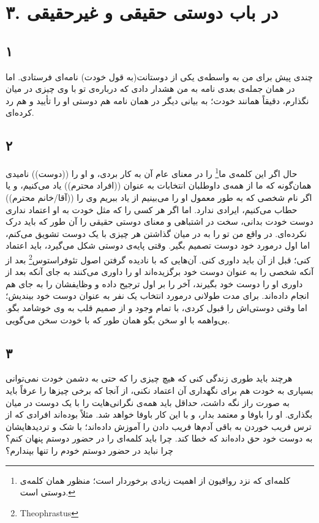 \documentclass{article}
\author{github.com/parasilius/moral-letters-to-lucilius}
\begin{document}
\section*{۳. در باب دوستی حقیقی و غیرحقیقی}
    \subsection*{۱}
    چندی پیش برای من به واسطه‌ی یکی از دوستانت(به قول خودت) نامه‌ای فرستادی.
    اما در همان جمله‌ی بعدی نامه به من هشدار دادی که درباره‌ی تو با وی چیزی در میان نگذارم، دقیقاً همانند خودت؛
    به بیانی دیگر در همان نامه هم دوستی او را تأیید و هم رد کرده‌ای.
    \subsection*{۲}
    حال اگر این کلمه‌ی ما\footnote{کلمه‌ای که نزد رواقیون از اهمیت زیادی برخوردار است؛ منظور همان کلمه‌ی دوستی است.} را در معنای عام آن به کار بردی، و او را ((دوست)) نامیدی همان‌گونه که ما از همه‌ی داوطلبان انتخابات به عنوان ((افراد محترم)) یاد می‌کنیم، و یا اگر نام شخصی که به طور معمول او را می‌بینیم از یاد ببریم وی را ((آقا/خانم محترم)) حطاب می‌‌کنیم، ایرادی ندارد.
    اما اگر هر کسی را که مثل خودت به او اعتماد نداری دوست خودت بدانی، سخت در اشتباهی و معنای دوستی حقیقی را آن طور که باید درک نکرده‌ای.
    در واقع من تو را به در میان گذاشتن هر چیزی با یک دوست تشویق می‌کنم، اما اول درمورد خود دوست تصمیم بگیر.
    وقتی پایه‌ی دوستی شکل می‌گیرد، باید اعتماد کنی؛ قبل از آن باید داوری کنی.
    آن‌هایی که با نادیده گرفتن اصول تئوفراستوس\footnote{Theophrastus} بعد از آنکه شخصی را به عنوان دوست خود برگزیده‌اند او را داوری می‌کنند به جای آنکه بعد از داوری او را دوست خود بگیرند، آخر را بر اول ترجیح داده و وظایفشان را به جای هم انجام داده‌اند.
    برای مدت طولانی درمورد انتخاب یک نفر به عنوان دوست خود بیندیش؛ اما وقتی دوستی‌اش را قبول کردی، با تمام وجود و از صمیم قلب به وی خوشامد بگو.
    بی‌واهمه با او سخن بگو همان طور که با خودت سخن می‌گویی.
    \subsection*{۳}
    هرچند باید طوری زندگی کنی که هیچ چیزی را که حتی به دشمن خودت نمی‌توانی بسپاری به خودت هم برای نگهداری آن اعتماد نکنی، از آنجا که برخی چیزها را عرفاً باید به صورت راز نگه داشت، حداقل باید همه‌ی نگرانی‌هایت را با یک دوست در میان بگذاری.
    او را باوفا و معتمد بدار، و با این کار باوفا خواهد شد.
    مثلاً بوده‌اند افرادی که از ترس فریب خوردن به باقی آدم‌ها فریب دادن را آموزش داده‌اند؛
    با شک و تردیدهایشان به دوست خود حق داده‌اند که خطا کند.
    چرا باید کلمه‌ای را در حضور دوستم پنهان کنم؟
    چرا نباید در حضور دوستم خودم را تنها بپندارم؟
\end{document}
